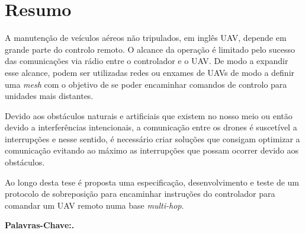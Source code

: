 \chapter*{Resumo}

A manutenção de veículos aéreos não tripulados, em inglês UAV, depende em grande parte do controlo remoto. O alcance da operação é limitado pelo sucesso das comunicações via rádio entre o controlador e o UAV. De modo a expandir esse alcance, podem ser utilizadas redes ou enxames de UAVs de modo a definir uma \textit{mesh} com o objetivo de se poder encaminhar comandos de controlo para unidades mais distantes.

Devido aos obstáculos naturais e artificiais que existem no nosso meio ou então devido a interferências intencionais, a comunicação entre os drones é suscetível a interrupções e nesse sentido, é necessário criar soluções que consigam optimizar a comunicação evitando ao máximo as interrupções que possam ocorrer devido aos obstáculos.

Ao longo desta tese é proposta uma especificação, desenvolvimento e teste de um protocolo de sobreposição para encaminhar instruções do controlador para comandar um UAV remoto numa base \textit{multi-hop}.\newline 

\noindent\textbf{Palavras-Chave:. }%
\makeatletter
\@keywordsPT
\makeatother